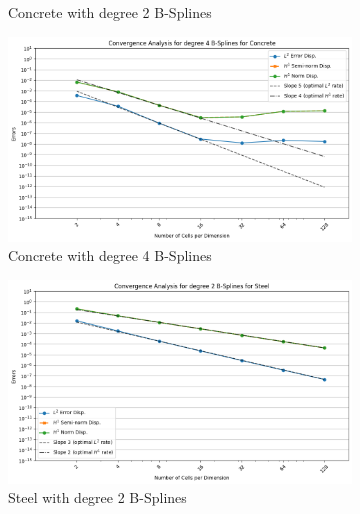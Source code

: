 \documentclass[a4paper,12pt,twoside]{report}
\begin{document}
\begin{figure}[!h]
\begin{subfigure}[b]{0.49\textwidth}
		\caption{Concrete with degree 2 B-Splines}
		\label{fig:concrete_degree_2}
	\end{subfigure}
	\begin{subfigure}[b]{0.49\textwidth}
		\centering
		\includegraphics[width=\textwidth]{figures/figures_non_mixed_realistic/convergence_plot_degree_4_lambda=17000000000.0.png}
		\caption{Concrete with degree 4 B-Splines}
		\label{fig:concrete_degree_4}
	\end{subfigure}
	\centering
	\begin{subfigure}[b]{0.49\textwidth}
		\centering
		\includegraphics[width=\textwidth]{figures/figures_non_mixed_realistic/convergence_plot_degree_2_lambda=120000000000.0.png}
		\caption{Steel with degree 2 B-Splines}
		\label{fig:steel_degree_2}
	\end{subfigure}
	\begin{subfigure}[b]{0.49\textwidth}
		\centering

\end{subfigure}
\end{figure}
\end{document}
